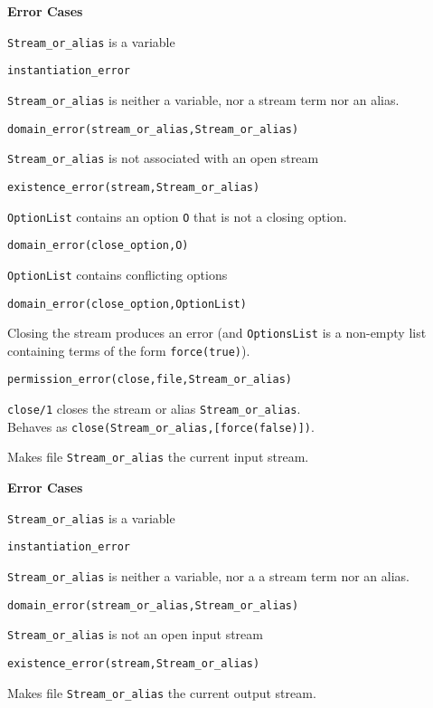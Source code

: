 \begin{description}
{\bf Error Cases}
\bi
\item 	{\tt Stream\_or\_alias} is a variable
\bi
\item {\tt instantiation\_error}
\ei
\item {\tt Stream\_or\_alias} is neither a variable, nor a stream term
  nor an alias.  
\bi
\item 	{\tt domain\_error(stream\_or\_alias,Stream\_or\_alias)}
\ei
\item 	{\tt Stream\_or\_alias} is not associated with an open stream
\bi
\item 	{\tt existence\_error(stream,Stream\_or\_alias)}
\ei
\item {\tt OptionList} contains an option {\tt O} that is not a closing
option.
\bi
\item {\tt domain\_error(close\_option,O)}
\ei
\item {\tt OptionList} contains conflicting options
\bi
\item {\tt domain\_error(close\_option,OptionList)}
\ei
\item 	Closing the stream produces an error (and {\tt OptionsList} is
	a non-empty list containing terms of the form {\tt force(true)}).
\bi
\item 	{\tt permission\_error(close,file,Stream\_or\_alias)}
\ei
\ei

%
{\tt close/1} closes the stream or alias {\tt Stream\_or\_alias}.\\
Behaves as {\tt close(Stream\_or\_alias,[force(false)])}.

    Makes file {\tt Stream\_or\_alias} the current input stream. 

{\bf Error Cases}
\bi
\item 	{\tt Stream\_or\_alias} is a variable
\bi
\item {\tt instantiation\_error}
\ei
\item {\tt Stream\_or\_alias} is neither a variable, nor a a stream
  term nor an alias.  
\bi
\item 	{\tt domain\_error(stream\_or\_alias,Stream\_or\_alias)}
\ei
\item 	{\tt Stream\_or\_alias} is not an open input stream
\bi
\item 	{\tt existence\_error(stream,Stream\_or\_alias)}
\ei
\ei

    Makes file {\tt Stream\_or\_alias} the current output stream. 


\end{description}
